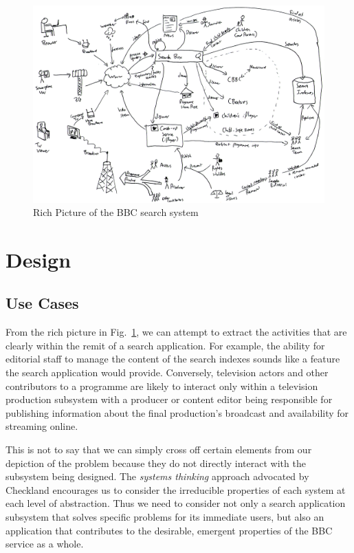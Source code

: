 \documentclass[oribibl]{llncs}
\begin{document}
\begin{figure}
  \begin{center}
    \includegraphics[width=\linewidth]{rich-picture.png}
  \end{center}
  \caption{Rich Picture of the BBC search system\label{rich-picture}}
\end{figure}

\section{Design}
\label{design}

\subsection{Use Cases}

From the rich picture in Fig.~\ref{rich-picture}, we can attempt to
extract the activities that are clearly within the remit of a search
application. For example, the ability for editorial staff to manage
the content of the search indexes sounds like a feature the search
application would provide. Conversely, television actors and other
contributors to a programme are likely to interact only within a television
production subsystem with a producer or content editor being responsible
for publishing information about the final production's broadcast and
availability for streaming online.

This is not to say that we can simply cross off certain elements from
our depiction of the problem because they do not directly interact
with the subsystem being designed. The \emph{systems thinking} approach
advocated by Checkland \citep{checkland1999systems} encourages us to
consider the irreducible properties of each system at each level
of abstraction. Thus we need to consider not only a search application
subsystem that solves specific problems for its immediate users, but
also an application that contributes to the desirable, emergent
properties of the BBC service as a whole.
\end{document}
